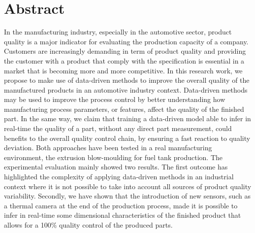 \chapter*{Abstract}

In the manufacturing industry, especially in the automotive sector, product quality is a major indicator for evaluating the production capacity of a company. Customers are increasingly demanding in term of product quality and providing the customer with a product that comply with the specification is essential in a market that is becoming more and more competitive. In this research work, we propose to make use of data-driven methods to improve the overall quality of the manufactured products in an automotive industry context. Data-driven methods may be used to improve the process control by better understanding how manufacturing process parameters, or features,  affect the quality of the finished part. In the same way, we claim that training a data-driven model able to infer in real-time the quality of a part, without any direct part measurement, could benefits to the overall quality control chain, by ensuring a fast reaction to quality deviation. Both approaches have been tested in a real manufacturing environment, the extrusion blow-moulding for fuel tank production. The experimental evaluation mainly showed two results. The first outcome has highlighted the complexity of applying data-driven methods in an industrial context where it is not possible to take into account all sources of product quality variability. Secondly, we have shown that the introduction of new sensors, such as a thermal camera at the end of the production process, made it is possible to infer in real-time some dimensional characteristics of the finished product that allows for a 100\% quality control of the produced parts.   